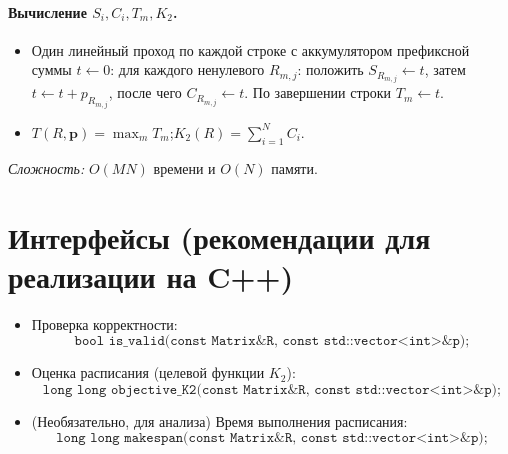 \documentclass[a4paper,12pt]{article}
\newcommand{\1}{\mathbf{1}} %
\begin{document}
\paragraph{Вычисление $S_i,C_i,T_m,K_2$.}
\begin{itemize}
  \item Один линейный проход по каждой строке с аккумулятором префиксной суммы $t\leftarrow 0$:
  для каждого ненулевого $R_{m,j}$: положить $S_{R_{m,j}}\leftarrow t$,
  затем $t\leftarrow t+p_{R_{m,j}}$, после чего $C_{R_{m,j}}\leftarrow t$.
  По завершении строки $T_m\leftarrow t$.
  \item $T(R,\mathbf{p})=\max_m T_m$;\quad $K_2(R)=\sum_{i=1}^N C_i$.
\end{itemize}
\emph{Сложность:} $O(MN)$ времени и $O(N)$ памяти.

\section{Интерфейсы (рекомендации для реализации на C++)}
\begin{itemize}
  \item Проверка корректности:
  \[
    \texttt{bool is\_valid(const Matrix\& R, const std::vector<int>\& p);}
  \]
  \item Оценка расписания (целевой функции $K_2$):
  \[
    \texttt{long long objective\_K2(const Matrix\& R, const std::vector<int>\& p);}
  \]
  \item (Необязательно, для анализа) Время выполнения расписания:
  \[
    \texttt{long long makespan(const Matrix\& R, const std::vector<int>\& p);}
  \]
\end{itemize}
\end{document}
